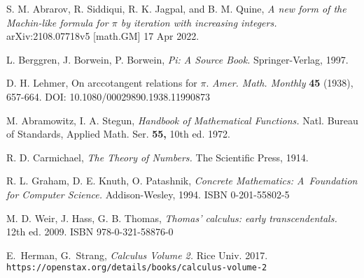 \documentclass[draft, 10pt]{article} %
\begin{document}
\begin{thebibliography}{999}

S. M. Abrarov, R. Siddiqui, R. K. Jagpal, and B. M. Quine,
{\it A new form of the Machin-like formula for $\pi$ by iteration with increasing integers.\/}
arXiv:2108.07718v5 [math.GM] 17 Apr 2022.

L. Berggren, J. Borwein, P. Borwein,
{\it Pi: A Source Book.\/}
Springer-Verlag, 1997.

D. H. Lehmer,
On arccotangent relations for $\pi$.
{\it Amer. Math. Monthly} {\bf 45}
(1938), 657-664. DOI: 10.1080/00029890.1938.11990873

M. Abramowitz, I. A. Stegun,
{\it Handbook of Mathematical Functions.\/}
Natl. Bureau of Standards, Applied Math. Ser. {\bf 55,} 10th ed. 1972.

R. D. Carmichael,
{\it The Theory of Numbers.\/}
The Scientific Press, 1914.

R. L. Graham, D. E. Knuth, O. Patashnik,
{\it Concrete Mathematics: A~Foundation for Computer Science.\/}
Addison-Wesley, 1994.\hfill\break
ISBN 0-201-55802-5

M. D. Weir, J. Hass, G. B. Thomas,
{\it Thomas’ calculus: early transcendentals.\/} 12th ed. 2009.
ISBN 978-0-321-58876-0

E.~Herman, %
G.~Strang, %
{\it Calculus Volume 2.\/} Rice Univ. 2017.\hfill\break
{\tt https://openstax.org/details/books/calculus-volume-2}


\end{thebibliography}
\end{document}

